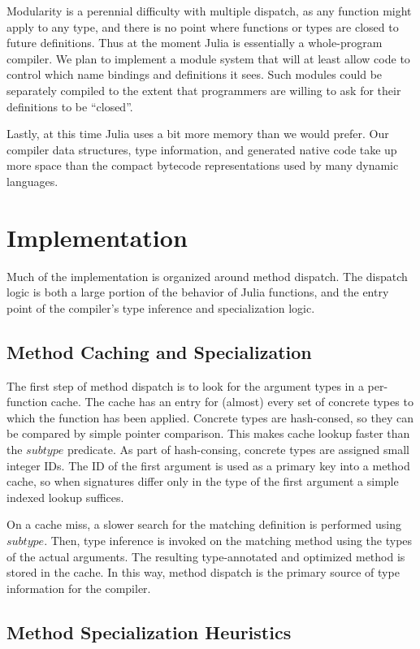 \documentclass[9pt]{sigplanconf}
\begin{document}
Modularity is a perennial difficulty with multiple dispatch, as any
function might apply to any type, and there is no point where functions or
types are closed to future definitions. Thus at the moment Julia is
essentially a whole-program compiler. We plan to implement a module system
that will at least allow code to control which name bindings and definitions
it sees. Such modules could be separately compiled to the extent that
programmers are willing to ask for their definitions to be ``closed''.

Lastly, at this time Julia uses a bit more memory than we would prefer.
Our compiler data structures, type information, and generated native code
take up more space than the compact bytecode representations used by many
dynamic languages.


\section{Implementation}

Much of the implementation is organized around method dispatch. The dispatch
logic is both a large portion of the behavior of Julia functions, and the
entry point of the compiler's type inference and specialization logic.

\subsection{Method Caching and Specialization}

The first step of method dispatch is to look for the argument types in a
per-function cache. The cache has an entry for (almost) every set of concrete
types to which the function has been applied. Concrete types are hash-consed,
so they can be compared by simple pointer comparison. This makes cache lookup
faster than the $subtype$ predicate. As part of hash-consing, concrete types
are assigned small integer IDs. The ID of the first argument is used as a
primary key into a method cache, so when signatures differ only in the
type of the first argument a simple indexed lookup suffices.

On a cache miss, a slower search for the matching definition is performed using
$subtype$.
Then, type inference is invoked on the matching method using the types
of the actual arguments. The resulting type-annotated and optimized method is
stored in the cache. In this way, method dispatch is the primary source of type
information for the compiler.

\subsection{Method Specialization Heuristics}
\end{document}
